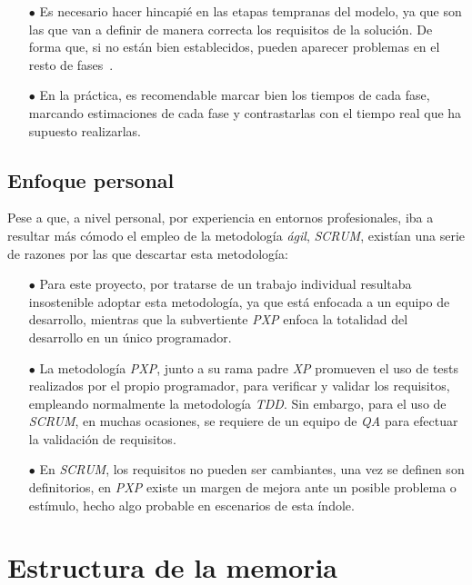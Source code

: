 \begin{itemize}
   \item[$\bullet$] Es necesario hacer hincapié en las etapas tempranas del modelo, ya que son
   las que van a definir de manera correcta los requisitos de la solución. De forma que, si no están bien establecidos, pueden 
   aparecer problemas en el resto de fases~\cite{wiegers2013software}.
   \item[$\bullet$] En la práctica, es recomendable marcar bien los tiempos de cada fase, marcando estimaciones de cada fase y contrastarlas con
   el tiempo real que ha supuesto realizarlas.
\end{itemize}

\subsection{Enfoque personal}

Pese a que, a nivel personal, por experiencia en entornos profesionales, iba a resultar más cómodo el empleo de la metodología \textit{ágil}, \textit{SCRUM},
existían una serie de razones por las que descartar esta metodología:


\begin{itemize}
   \item[$\bullet$] Para este proyecto, por tratarse de un trabajo individual resultaba insostenible adoptar esta metodología,
   ya que está enfocada a un equipo de desarrollo, mientras que la subvertiente \textit{PXP} enfoca
   la totalidad del desarrollo en un único programador.
   \item[$\bullet$] La metodología \textit{PXP}, junto a su rama padre \textit{XP} promueven el uso de
   tests realizados por el propio programador, para verificar y validar los requisitos, empleando normalmente la metodología \textit{TDD}. Sin embargo, para
   el uso de \textit{SCRUM}, en muchas ocasiones, se requiere de un equipo de \textit{QA} para efectuar la validación de requisitos.
   \item[$\bullet$] En \textit{SCRUM}, los requisitos no pueden ser cambiantes, una vez se definen son definitorios,
   en \textit{PXP} existe un margen de mejora ante un posible problema o estímulo, hecho algo probable en
   escenarios de esta índole.
\end{itemize}



\section{Estructura de la memoria} %

